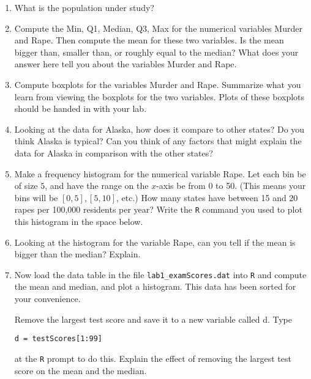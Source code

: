 \documentclass{report}
\begin{document}
\begin{enumerate}

\item What is the population under study?


\item Compute the Min, Q1, Median, Q3, Max for the numerical variables
Murder and Rape.  Then compute the mean for these two variables.  Is
the mean bigger than, smaller than, or roughly equal to the median?
What does your answer here tell you about the variables Murder and
Rape.


\item Compute boxplots for the variables Murder and Rape.  Summarize what
you learn from viewing the boxplots for the two variables.  Plots of these boxplots
should be handed in with your lab.


\item Looking at the data for Alaska, how does it compare to other states?
Do you think Alaska is typical?  Can you think of any factors that
might explain the data for Alaska in comparison with the other
states?


\item Make a frequency histogram for the numerical variable Rape.  Let each
bin be of size $5$, and have the range on the $x$-axis be from 0 to
50.  (This means your bins will be $[0,5], [5,10]$, etc.)  How many
states have between 15 and 20 rapes per 100,000 residents per year?
Write the {\tt R} command you used to plot this histogram in the space
below.

      
\item Looking at the histogram for the variable Rape, can you tell if
the mean is bigger than the median?  Explain.


\item Now load the data table in the file {\tt lab1\_examScores.dat} into
{\tt R} and compute the mean and median, and plot a histogram.  This
data has been sorted for your convenience.

Remove the largest test score and save it to a new variable called d.  Type

\hskip 1cm {\tt d = testScores[1:99]}

at the {\tt R} prompt to do this.  Explain the effect of removing the
largest test score on the mean and the median.

\end{enumerate}
 
\end{document}
